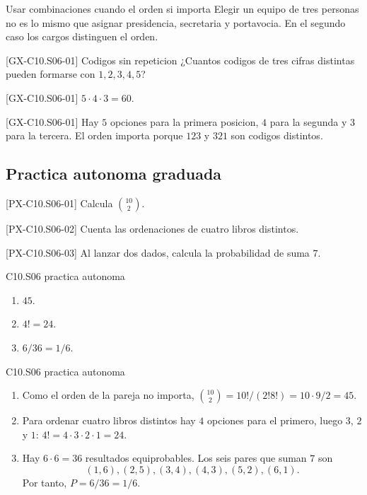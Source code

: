 \begin{commonerror}{Usar combinaciones cuando el orden si importa}
Elegir un equipo de tres personas no es lo mismo que asignar presidencia, secretaria y portavocia.
En el segundo caso los cargos distinguen el orden.
\end{commonerror}

\begin{guidedexercise}{[GX-C10.S06-01] Codigos sin repeticion}
¿Cuantos codigos de tres cifras distintas pueden formarse con \(1,2,3,4,5\)?
\end{guidedexercise}
\begin{shortanswer}{[GX-C10.S06-01]} \(5\cdot4\cdot3=60\). \end{shortanswer}
\begin{fullsolution}{[GX-C10.S06-01]}
Hay \(5\) opciones para la primera posicion, \(4\) para la segunda y \(3\) para la tercera. El
orden importa porque \(123\) y \(321\) son codigos distintos.
\end{fullsolution}

\subsection*{Practica autonoma graduada}
\begin{exercise}{[PX-C10.S06-01] Calcula \(\binom{10}{2}\).}\end{exercise}
\begin{exercise}{[PX-C10.S06-02] Cuenta las ordenaciones de cuatro libros distintos.}\end{exercise}
\begin{exercise}{[PX-C10.S06-03] Al lanzar dos dados, calcula la probabilidad de suma \(7\).}\end{exercise}
\begin{shortanswer}{C10.S06 practica autonoma}
\begin{enumerate}
  \item \(45\).
  \item \(4!=24\).
  \item \(6/36=1/6\).
\end{enumerate}
\end{shortanswer}
\begin{fullsolution}{C10.S06 practica autonoma}
\begin{enumerate}
  \item Como el orden de la pareja no importa,
  \(\binom{10}{2}=10!/(2!8!)=10\cdot9/2=45\).
  \item Para ordenar cuatro libros distintos hay \(4\) opciones para el primero, luego \(3\),
  \(2\) y \(1\): \(4!=4\cdot3\cdot2\cdot1=24\).
  \item Hay \(6\cdot6=36\) resultados equiprobables. Los seis pares que suman \(7\) son
  \[
  (1,6),(2,5),(3,4),(4,3),(5,2),(6,1).
  \]
  Por tanto, \(P=6/36=1/6\).
\end{enumerate}
\end{fullsolution}

